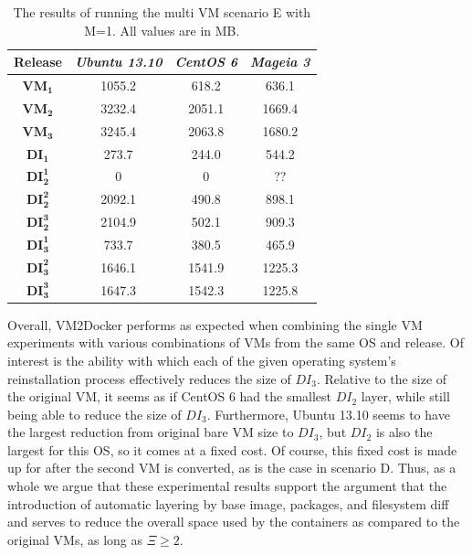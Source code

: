 \begin{enumerate}
\begin{table}[h]
    \begin{tabular}{| c | c | c | c|}
    \hline
    \bfseries Release & \itshape Ubuntu 13.10 & \itshape CentOS 6 & \itshape Mageia 3\\ \hline
\bfseries $\boldsymbol{VM_1}$ & 1055.2 & 618.2 & 636.1\\ \hline
\bfseries $\boldsymbol{VM_2}$ & 3232.4 & 2051.1 & 1669.4\\ \hline
\bfseries $\boldsymbol{VM_3}$ &  3245.4 & 2063.8 & 1680.2\\ \hline \hline
    \bfseries $\boldsymbol{DI_1}$ & 273.7 & 244.0 & 544.2\\ \hline
    \bfseries $\boldsymbol{DI_2^1}$ & 0 & 0 & ??\\ \hline 
\bfseries $\boldsymbol{DI_2^2}$ & 2092.1 & 490.8 & 898.1\\ \hline 
\bfseries $\boldsymbol{DI_2^3}$ & 2104.9 & 502.1 & 909.3\\ \hline 
\bfseries $\boldsymbol{DI_3^1}$  & 733.7 & 380.5 & 465.9\\ \hline 
\bfseries $\boldsymbol{DI_3^2}$ & 1646.1 & 1541.9 & 1225.3\\ \hline 
\bfseries $\boldsymbol{DI_3^3}$ & 1647.3 & 1542.3 & 1225.8\\ \hline 
    \end{tabular}
\caption{The results of running the multi VM scenario E with M=1. All values are in MB.}
\label{table:multiscenarioe}
\end{table}

\end{enumerate}


Overall, VM2Docker performs as expected when combining the single VM experiments with various combinations of VMs from the same OS and release. Of interest is the ability with which each of the given operating system's reinstallation process effectively reduces the size of $DI_3$. Relative to the size of the original VM, it seems as if CentOS 6 had the smallest $DI_2$ layer, while still being able to reduce the size of $DI_3$. Furthermore, Ubuntu 13.10 seems to have the largest reduction from original bare VM size to $DI_3$, but $DI_2$ is also the largest for this OS, so it comes at a fixed cost. Of course, this fixed cost is made up for after the second VM is converted, as is the case in scenario D. Thus, as a whole we argue that these experimental results support the argument that the introduction of automatic layering by base image, packages, and filesystem diff and serves to reduce the overall space used by the containers as compared to the original VMs, as long as $\Xi \ge 2$. 



